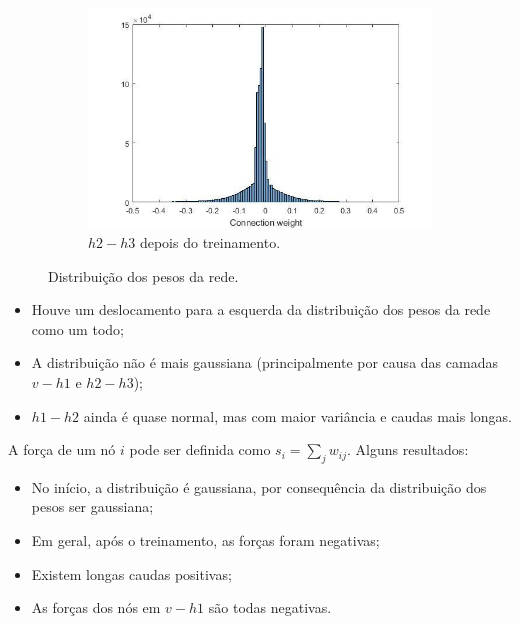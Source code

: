 \documentclass{article}
\begin{document}
\begin{figure}[h!]
\begin{center}
\begin{subfigure}{0.5\textwidth}
                        \includegraphics[scale=0.3]{Images/Weights distribution (5).png}
                        \caption{$h2 - h3$ depois do treinamento.}
                    \end{subfigure}
                \end{center}
                \caption{Distribuição dos pesos da rede.}
                \label{fig6}
            \end{figure}

            \begin{itemize}
                \item Houve um deslocamento para a esquerda da distribuição dos pesos da rede como um todo;
                \item A distribuição não é mais gaussiana (principalmente por causa das camadas $v - h1$ e $h2 - h3$);
                \item $h1 - h2$ ainda é quase normal, mas com maior variância e caudas mais longas.
            \end{itemize}

            A força de um nó $i$ pode ser definida como $s_i = \sum_j w_{ij}$. Alguns resultados:

            \begin{itemize}
                \item No início, a distribuição é gaussiana, por consequência da distribuição dos pesos ser gaussiana;
                \item Em geral, após o treinamento, as forças foram negativas;
                \item Existem longas caudas positivas;
                \item As forças dos nós em $v - h1$ são todas negativas.
            \end{itemize}
\end{document}

